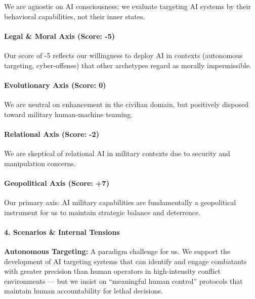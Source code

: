 We are agnostic on AI consciousness; we evaluate targeting AI systems by
their behavioral capabilities, not their inner states.

\paragraph{Legal \& Moral Axis (Score:
-5)}\label{legal-moral-axis-score--5-1}

Our score of -5 reflects our willingness to deploy AI in contexts
(autonomous targeting, cyber-offense) that other archetypes regard as
morally impermissible.

\paragraph{Evolutionary Axis (Score:
0)}\label{evolutionary-axis-score-0-3}

We are neutral on enhancement in the civilian domain, but positively
disposed toward military human-machine teaming.

\paragraph{Relational Axis (Score:
-2)}\label{relational-axis-score--2-1}

We are skeptical of relational AI in military contexts due to security
and manipulation concerns.

\paragraph{Geopolitical Axis (Score:
+7)}\label{geopolitical-axis-score-7-1}

Our primary axis: AI military capabilities are fundamentally a
geopolitical instrument for us to maintain strategic balance and
deterrence.

\paragraph{4. Scenarios \& Internal
Tensions}\label{scenarios-internal-tensions-23}

\textbf{Autonomous Targeting:} A paradigm challenge for us. We support
the development of AI targeting systems that can identify and engage
combatants with greater precision than human operators in high-intensity
conflict environments --- but we insist on ``meaningful human control''
protocols that maintain human accountability for lethal decisions.

